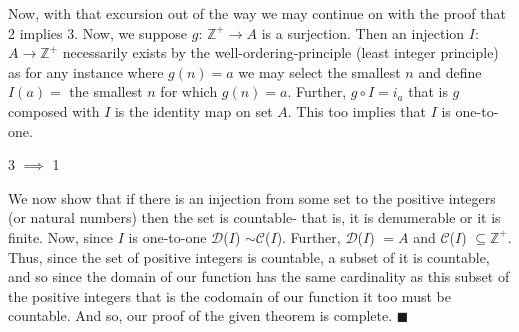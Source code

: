 \documentclass{article}
\begin{document}
\par Now, with that excursion out of the way we may continue on with the proof that 2 implies 3. Now, we suppose $g$: $\mathbb{Z}^{+} \to A$ is a surjection. Then an injection $I$: $A \to \mathbb{Z}^{+}$ necessarily exists by the well-ordering-principle (least integer principle) as for any instance where $g(n)=a$ we may select the smallest $n$ and define $I(a) =$ the smallest $n$ for which $g(n)=a$. Further, $g \circ I = i_{a}$ that is $g$ composed with $I$ is the identity map on set $A$. This too implies that $I$ is one-to-one.  
\begin{flushleft}
3 $\implies$ 1
\end{flushleft}
\par We now show that if there is an injection from some set to the positive integers (or natural numbers) then the set is countable- that is, it is denumerable or it is finite. Now, since $I$ is one-to-one $\mathcal{D}$($I$) $\sim \mathcal{C}$($I$). Further, $\mathcal{D}$($I$) $= A$ and $\mathcal{C}$($I$) $\subseteq \mathbb{Z}^{+}$. Thus, since the set of positive integers is countable, a subset of it is countable, and so since the domain of our function has the same cardinality as this subset of the positive integers that is the codomain of our function it too must be countable. And so, our proof of the given theorem is complete.
{$\blacksquare$}
\end{document}
